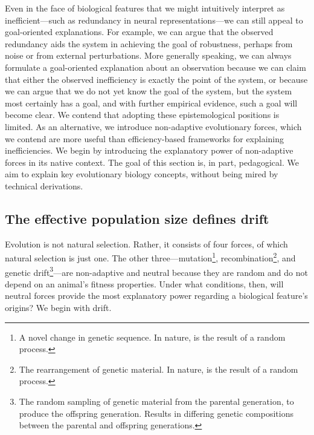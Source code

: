 \documentclass[twocolumn]{article}
\begin{document}
Even in the face of biological features that we might intuitively interpret as inefficient---such as redundancy in neural representations---we can still appeal to goal-oriented explanations. For example, we can argue that the observed redundancy aids the system in achieving the goal of robustness, perhaps from noise or from external perturbations. More generally speaking, we can always formulate a goal-oriented explanation about an observation because we can claim that either the observed inefficiency is exactly the point of the system, or because we can argue that we do not yet know the goal of the system, but the system most certainly has a goal, and with further empirical evidence, such a goal will become clear. We contend that adopting these epistemological positions is limited. As an alternative, we introduce non-adaptive evolutionary forces, which we contend are more useful than efficiency-based frameworks for explaining inefficiencies. We begin by introducing the explanatory power of non-adaptive forces in its native context. The goal of this section is, in part, pedagogical. We aim to explain key evolutionary biology concepts, without being mired by technical derivations. 

\subsection{The effective population size defines drift}

Evolution is not natural selection. Rather, it consists of four forces, of which natural selection is just one. The other three---mutation\footnote{A novel change in genetic sequence. In nature, is the result of a random process.}, recombination\footnote{The rearrangement of genetic material. In nature, is the result of a random process.}, and genetic drift\footnote{The random sampling of genetic material from the parental generation, to produce the offspring generation. Results in differing genetic compositions between the parental and offspring generations.}---are non-adaptive and neutral because they are random and do not depend on an animal's fitness properties. Under what conditions, then, will neutral forces provide the most explanatory power regarding a biological feature's origins? We begin with drift. 
\end{document}
